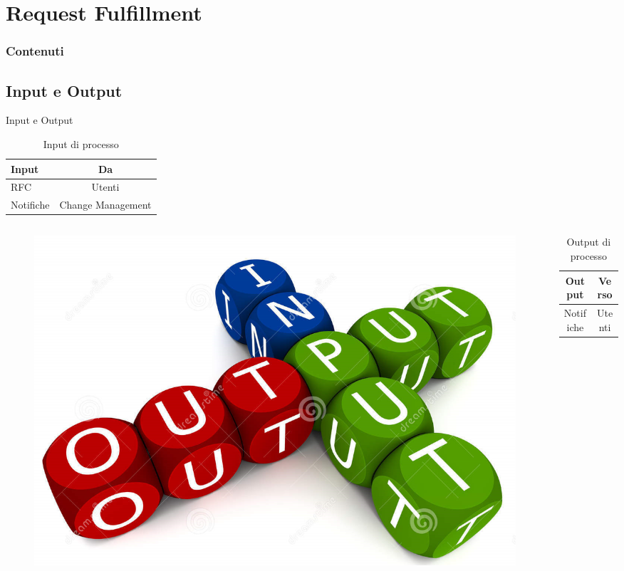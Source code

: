 %
\section{Request Fulfillment}
\frame
{
\frametitle{Contenuti}
\tableofcontents[currentsection]
}

\subsection*{Input e Output}
\begin{frame}{Input e Output}
\begin{table}
\begin{tabular}{ l | c }
\textbf{Input} & \textbf{Da}\\
\hline
RFC & Utenti\\
Notifiche & Change Management\\
\end{tabular}
\caption{Input di processo}
\end{table}
\begin{columns}
\begin{column}{0.3\textwidth}
\begin{figure}
\includegraphics[scale=0.1]{Images/Input_output.png}
\end{figure}
\end{column}
\begin{column}{0.7\textwidth}
\begin{table}
\begin{tabular}{ c | c }
\textbf{Output} & \textbf{Verso}\\
\hline
Notifiche & Utenti\\
\end{tabular}
\caption{Output di processo}
\end{table}
\end{column}
\end{columns}
\end{frame}

